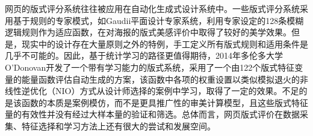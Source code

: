 网页的版式评分系统往往被应用在自动化生成式设计系统中。一些版式评分系统采用基于规则的专家模式，如Gaudii平面设计专家系统，利用专家设定的128条模糊逻辑规则作为适应函数，在对海报的版式美感评价中取得了较好的美学效果。但是，现实中的设计存在大量原则之外的特例，手工定义所有版式规则和适用条件是几乎不可能的。因此，基于统计学习的路径更值得期待，2014年多伦多大学O’Donovan开发了一个带有学习能力的版式系统，采用了一个由122个版式特征变量的能量函数评估自动生成的方案，该函数中各项的权重设置以类似模拟退火的非线性逆优化（NIO）方式从设计师选择的案例中学习，取得了一定的效果。不足的是该函数的本质是案例模仿，而不是更具推广性的审美计算模型，且这些版式特征量的有效性并没有经过大样本量的验证和筛选。总体而言，网页版式评价在数据采集、特征选择和学习方法上还有很大的尝试和发展空间。
